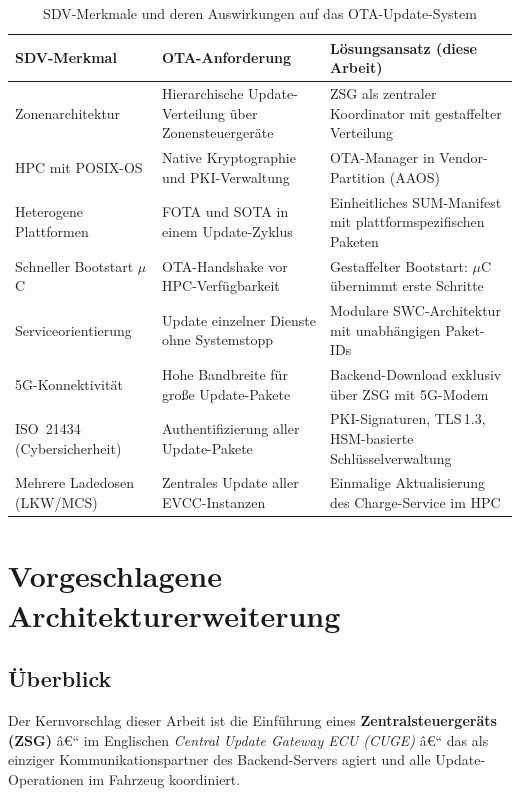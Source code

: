 ﻿\documentclass[12pt,a4paper,twoside]{article}
\begin{document}
\begin{table}[h]
  \centering
  \caption{SDV-Merkmale und deren Auswirkungen auf das OTA-Update-System}
  \label{tab:sdv_ota_impact}
  \begin{tabularx}{\textwidth}{lXX}
    \toprule
    \textbf{SDV-Merkmal} & \textbf{OTA-Anforderung} & \textbf{Lösungsansatz (diese Arbeit)} \\
    \midrule
    Zonenarchitektur & Hierarchische Update-Verteilung über Zonensteuergeräte
      & ZSG als zentraler Koordinator mit gestaffelter Verteilung \\
    HPC mit POSIX-OS & Native Kryptographie und PKI-Verwaltung
      & OTA-Manager in Vendor-Partition (AAOS) \\
    Heterogene Plattformen & FOTA und SOTA in einem Update-Zyklus
      & Einheitliches SUM-Manifest mit plattformspezifischen Paketen \\
    Schneller Bootstart $\mu$C & OTA-Handshake vor HPC-Verfügbarkeit
      & Gestaffelter Bootstart: $\mu$C übernimmt erste Schritte \\
    Serviceorientierung & Update einzelner Dienste ohne Systemstopp
      & Modulare SWC-Architektur mit unabhängigen Paket-IDs \\
    5G-Konnektivität & Hohe Bandbreite für große Update-Pakete
      & Backend-Download exklusiv über ZSG mit 5G-Modem \\
    ISO~21434 (Cybersicherheit) & Authentifizierung aller Update-Pakete
      & PKI-Signaturen, TLS\,1.3, HSM-basierte Schlüsselverwaltung \\
    Mehrere Ladedosen (LKW/MCS) & Zentrales Update aller EVCC-Instanzen
      & Einmalige Aktualisierung des Charge-Service im HPC \\
    \bottomrule
  \end{tabularx}
\end{table}


\section{Vorgeschlagene Architekturerweiterung}
\label{sec:architektur}


\subsection{Überblick}

Der Kernvorschlag dieser Arbeit ist die Einführung eines
\textbf{Zentralsteuergeräts (ZSG)} â€“ im Englischen \textit{Central Update
Gateway ECU (CUGE)} â€“ das als einziger Kommunikationspartner des
Backend-Servers agiert und alle Update-Operationen im Fahrzeug koordiniert.
\end{document}

